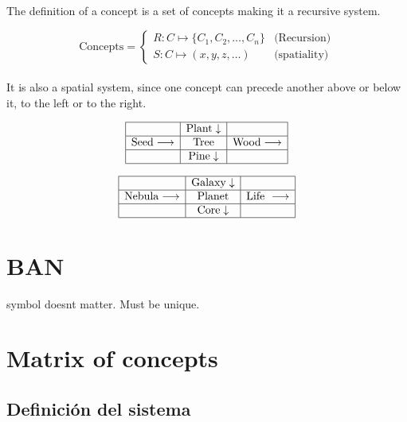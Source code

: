 \documentclass[12pt]{article}
\begin{document}
The definition of a concept is a set of concepts making it a recursive system.

\[
\text{Concepts} = \begin{cases} 
	R : C \mapsto \{C_1, C_2, \dots, C_n\} & \text{(Recursion)} \\
	S : C \mapsto (x, y, z, \dots) & \text{(spatiality)} 
\end{cases}
\]\\

 It is also a spatial system, since one concept can precede another above or below it, to the left or to the right.
 
$$\begin{array}{|c|c|c|}
	\hline
	& \text{Plant} \downarrow & \\ \hline
	\text{Seed} \longrightarrow & \mathbf{\text{Tree}} & \text{Wood} \longrightarrow \\ \hline
	& \text{Pine} \downarrow & \\ \hline
\end{array}$$

$$\begin{array}{|c|c|c|} 
	\hline 
	& \text{Galaxy} \downarrow & \\ \hline 
	\text{Nebula} \longrightarrow  & \mathbf{\text{Planet}} & \text{Life } \longrightarrow \\ \hline 
	& \text{Core} \downarrow & \\ \hline
\end{array}$$


\section{BAN}

symbol doesnt matter. Must be unique.

\section{Matrix of concepts}

\subsection{Definición del sistema}
\end{document}

